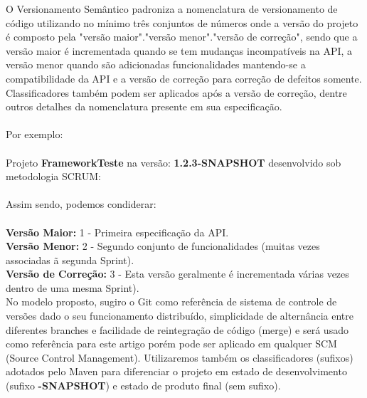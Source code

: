 O Versionamento Semântico padroniza a nomenclatura de versionamento de código utilizando no mínimo três conjuntos de números onde a versão do projeto é composto pela "versão maior"."versão menor"."versão de correção", sendo que a versão maior é incrementada quando se tem mudanças incompatíveis na API, a versão menor quando são adicionadas funcionalidades mantendo-se a compatibilidade da API e a versão de correção para correção de defeitos somente. Classificadores também podem ser aplicados após a versão de correção, dentre outros detalhes da nomenclatura presente em sua especificação.
\\\\
Por exemplo:
\\\\
Projeto \textbf{FrameworkTeste} na versão:\textbf{ 1.2.3-SNAPSHOT} desenvolvido sob metodologia SCRUM:
\\\\
Assim sendo, podemos condiderar:
\\\\
\textbf{Versão Maior:} 1 - Primeira especificação da API.\\
\textbf{Versão Menor:} 2 - Segundo conjunto de funcionalidades (muitas vezes associadas \~a segunda Sprint).\\
\textbf{Versão de Correção:} 3 - Esta versão geralmente é incrementada várias vezes dentro de uma mesma Sprint).\\

No modelo proposto, sugiro o Git como referência de sistema de controle de versões dado o seu funcionamento distribuído, simplicidade de alternância entre diferentes branches e facilidade de reintegração de código (merge) e será usado como referência para este artigo porém pode ser aplicado em qualquer SCM (Source Control Management). Utilizaremos também os classificadores (sufixos) adotados pelo Maven para diferenciar o projeto em estado de desenvolvimento (sufixo \textbf{-SNAPSHOT}) e estado de produto final (sem sufixo).
